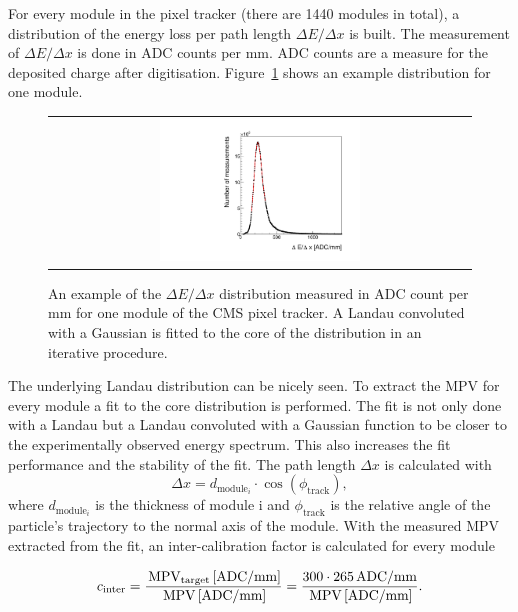 For every module in the pixel tracker (there are 1440 modules in total), a distribution of the energy loss per path length $\Delta E/\Delta x$ is built.
The measurement of $\Delta E/\Delta x$ is done in ADC counts per mm.
ADC counts are a measure for the deposited charge after digitisation.
Figure~\ref{fig:dEdx_Module} shows an example distribution for one module.
\begin{figure}[!t]
  \centering 
  \begin{tabular}{c}
  \includegraphics[width=0.49\textwidth]{figures/analysis/Landau_Module_352476680.pdf}
  \end{tabular}
  \caption{An example of the $\Delta E/\Delta x$ distribution measured in ADC count per mm for one module of the CMS pixel tracker. 
           A Landau convoluted with a Gaussian is fitted to the core of the distribution in an iterative procedure.} 
  \label{fig:dEdx_Module}
\end{figure}
The underlying Landau distribution can be nicely seen. 
To extract the MPV for every module a fit to the core distribution is performed.
The fit is not only done with a Landau but a Landau convoluted with a Gaussian function to be closer to the experimentally observed energy spectrum.
This also increases the fit performance and the stability of the fit.
The path length $\Delta x$ is calculated with
\begin{equation}
\Delta x = d_{\text{module}_i} \cdot \cos(\phi_{\text{track}}),
\end{equation}
where $d_{\text{module}_i}$ is the thickness of module i and $\phi_{\text{track}}$ is the relative angle of the particle's trajectory to the normal axis of the module.
With the measured MPV extracted from the fit, an inter-calibration factor is calculated for every module

\begin{equation}
c_{\text{inter}}=\frac{\,\text{MPV}_{\text{target}}\, [\text{ADC/mm}]}{\,\text{MPV}\, [\text{ADC/mm}]} = \frac{300 \cdot 265 \, \text{ADC/mm}}{\,\text{MPV}\, [\text{ADC/mm}]}.
\end{equation}

